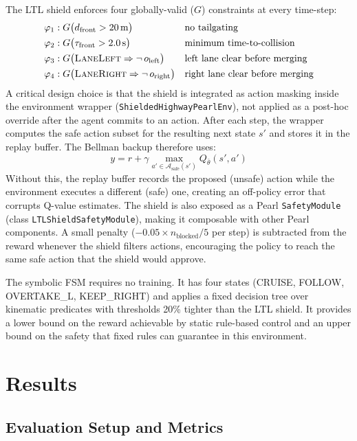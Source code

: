 \documentclass[11pt,a4paper]{article}
\begin{document}
The LTL shield enforces four globally-valid (\(G\)) constraints at every time-step:
\begin{align*}
  \varphi_1 &: G\bigl(d_\text{front} > 20\,\text{m}\bigr) & &\text{no tailgating}\\
  \varphi_2 &: G\bigl(\tau_\text{front} > 2.0\,\text{s}\bigr) & &\text{minimum time-to-collision}\\
  \varphi_3 &: G\bigl(\textsc{LaneLeft} \Rightarrow \neg\, o_\text{left}\bigr) & &\text{left lane clear before merging}\\
  \varphi_4 &: G\bigl(\textsc{LaneRight} \Rightarrow \neg\, o_\text{right}\bigr) & &\text{right lane clear before merging}
\end{align*}
A critical design choice is that the shield is integrated as action masking inside the environment wrapper (\texttt{ShieldedHighwayPearlEnv}), not applied as a post-hoc override after the agent commits to an action. After each step, the wrapper computes the safe action subset for the resulting next state \(s'\) and stores it in the replay buffer. The Bellman backup therefore uses:
\[
  y = r + \gamma \max_{a' \in \mathcal{A}_\text{safe}(s')} Q_{\bar\theta}(s', a')
\]
Without this, the replay buffer records the proposed (unsafe) action while the environment executes a different (safe) one, creating an off-policy error that corrupts Q-value estimates. The shield is also exposed as a Pearl \texttt{SafetyModule} (class \texttt{LTLShieldSafetyModule}), making it composable with other Pearl components. A small penalty (\(-0.05 \times n_\text{blocked}/5\) per step) is subtracted from the reward whenever the shield filters actions, encouraging the policy to reach the same safe action that the shield would approve.

The symbolic FSM requires no training. It has four states (CRUISE, FOLLOW, OVERTAKE\_L, KEEP\_RIGHT) and applies a fixed decision tree over kinematic predicates with thresholds 20\% tighter than the LTL shield. It provides a lower bound on the reward achievable by static rule-based control and an upper bound on the safety that fixed rules can guarantee in this environment.

\section{Results}

\subsection{Evaluation Setup and Metrics}
\end{document}
